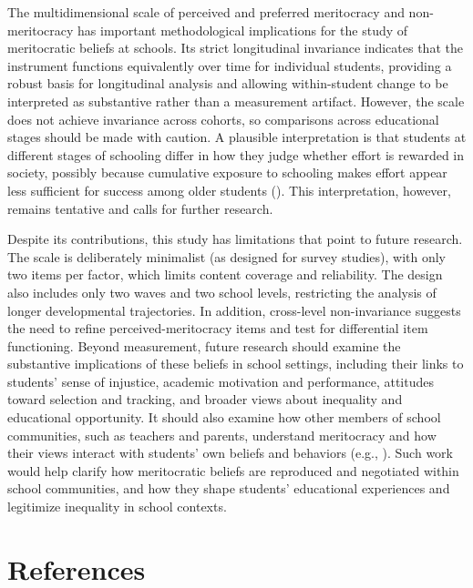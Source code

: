 \documentclass[
  13pt,
]{article}
\begin{document}
The multidimensional scale of perceived and preferred meritocracy and
non-meritocracy has important methodological implications for the study
of meritocratic beliefs at schools. Its strict longitudinal invariance
indicates that the instrument functions equivalently over time for
individual students, providing a robust basis for longitudinal analysis
and allowing within-student change to be interpreted as substantive
rather than a measurement artifact. However, the scale does not achieve
invariance across cohorts, so comparisons across educational stages
should be made with caution. A plausible interpretation is that students
at different stages of schooling differ in how they judge whether effort
is rewarded in society, possibly because cumulative exposure to
schooling makes effort appear less sufficient for success among older
students ().
This interpretation, however, remains tentative and calls for further
research.

Despite its contributions, this study has limitations that point to
future research. The scale is deliberately minimalist (as designed for
survey studies), with only two items per factor, which limits content
coverage and reliability. The design also includes only two waves and
two school levels, restricting the analysis of longer developmental
trajectories. In addition, cross-level non-invariance suggests the need
to refine perceived-meritocracy items and test for differential item
functioning. Beyond measurement, future research should examine the
substantive implications of these beliefs in school settings, including
their links to students' sense of injustice, academic motivation and
performance, attitudes toward selection and tracking, and broader views
about inequality and educational opportunity. It should also examine how
other members of school communities, such as teachers and parents,
understand meritocracy and how their views interact with students' own
beliefs and behaviors (e.g.,
). Such work
would help clarify how meritocratic beliefs are reproduced and
negotiated within school communities, and how they shape students'
educational experiences and legitimize inequality in school contexts.

\section{References}\label{references}
\end{document}
